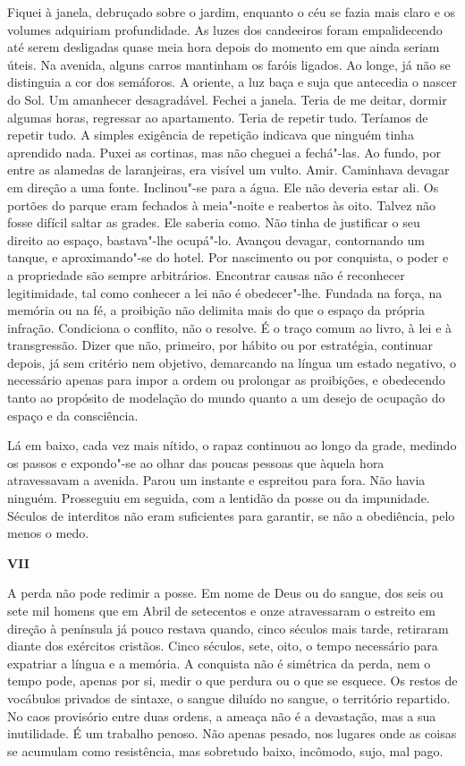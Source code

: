 Fiquei à janela, debruçado sobre o jardim, enquanto o céu se fazia mais
claro e os volumes adquiriam profundidade. As luzes dos candeeiros foram
empalidecendo até serem desligadas quase meia hora depois do momento em
que ainda seriam úteis. Na avenida, alguns carros mantinham os faróis
ligados. Ao longe, já não se distinguia a cor dos semáforos. A oriente,
a luz baça e suja que antecedia o nascer do Sol. Um amanhecer
desagradável. Fechei a janela. Teria de me deitar, dormir algumas horas,
regressar ao apartamento. Teria de repetir tudo. Teríamos de repetir
tudo. A simples exigência de repetição indicava que ninguém tinha
aprendido nada. Puxei as cortinas, mas não cheguei a fechá"-las. Ao
fundo, por entre as alamedas de laranjeiras, era visível um vulto. Amir.
Caminhava devagar em direção a uma fonte. Inclinou"-se para a água. Ele
não deveria estar ali. Os portões do parque eram fechados à meia"-noite
e reabertos às oito. Talvez não fosse difícil saltar as grades. Ele
saberia como. Não tinha de justificar o seu direito ao espaço,
bastava"-lhe ocupá"-lo. Avançou devagar, contornando um tanque, e
aproximando"-se do hotel. Por nascimento ou por conquista, o poder e a
propriedade são sempre arbitrários. Encontrar causas não é reconhecer
legitimidade, tal como conhecer a lei não é obedecer"-lhe. Fundada na
força, na memória ou na fé, a proibição não delimita mais do que o
espaço da própria infração. Condiciona o conflito, não o resolve. É o
traço comum ao livro, à lei e à transgressão. Dizer que não, primeiro,
por hábito ou por estratégia, continuar depois, já sem critério nem
objetivo, demarcando na língua um estado negativo, o necessário apenas
para impor a ordem ou prolongar as proibições, e obedecendo tanto ao
propósito de modelação do mundo quanto a um desejo de ocupação do espaço
e da consciência.

Lá em baixo, cada vez mais nítido, o rapaz continuou ao longo da grade,
medindo os passos e expondo"-se ao olhar das poucas pessoas que àquela
hora atravessavam a avenida. Parou um instante e espreitou para fora.
Não havia ninguém. Prosseguiu em seguida, com a lentidão da posse ou da
impunidade. Séculos de interditos não eram suficientes para garantir, se
não a obediência, pelo menos o medo.

\vspace*{1.8cm}
\noindent{}\textbf{VII}

\bigskip

A perda não pode redimir a posse. Em nome de Deus ou do sangue, dos seis
ou sete mil homens que em Abril de setecentos e onze atravessaram o
estreito em direção à península já pouco restava quando, cinco séculos
mais tarde, retiraram diante dos exércitos cristãos. Cinco séculos,
sete, oito, o tempo necessário para expatriar a língua e a memória. A
conquista não é simétrica da perda, nem o tempo pode, apenas por si,
medir o que perdura ou o que se esquece. Os restos de vocábulos privados
de sintaxe, o sangue diluído no sangue, o território repartido. No caos
provisório entre duas ordens, a ameaça não é a devastação, mas a sua
inutilidade. É um trabalho penoso. Não apenas pesado, nos lugares onde
as coisas se acumulam como resistência, mas sobretudo baixo, incômodo,
sujo, mal pago.

